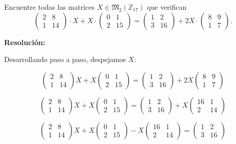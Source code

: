 \documentclass[a4paper,12pt]{article}
\begin{document}
\begin{ejercicio}[title=Ejercicio 20]
Encuentre todas las matrices $X \in \mathfrak{M}_2(\mathbb{Z}_{17})$ que verifican
\[
\begin{pmatrix}
2 & 8\\
1 & 14
\end{pmatrix} \cdot X + X \cdot
\begin{pmatrix}
0 & 1\\
2 & 15
\end{pmatrix}
=
\begin{pmatrix}
1 & 2\\
3 & 16
\end{pmatrix}
+ 2X \cdot
\begin{pmatrix}
8 & 9\\
1 & 7
\end{pmatrix}.
\]

\tcblower
\textbf{Resolución:}

Desarrollando paso a paso, despejamos $X$:

\[
\begin{pmatrix}
2 & 8\\
1 & 14
\end{pmatrix} X
+
X
\begin{pmatrix}
0 & 1\\
2 & 15
\end{pmatrix}
=
\begin{pmatrix}
1 & 2\\
3 & 16
\end{pmatrix}
+
2 X
\begin{pmatrix}
8 & 9\\
1 & 7
\end{pmatrix}
\]

\[
\begin{pmatrix}
2 & 8\\
1 & 14
\end{pmatrix} X
+
X
\begin{pmatrix}
0 & 1\\
2 & 15
\end{pmatrix}
=
\begin{pmatrix}
1 & 2\\
3 & 16
\end{pmatrix}
+
X
\begin{pmatrix}
16 & 1\\
2 & 14
\end{pmatrix}
\]

\[
\begin{pmatrix}
2 & 8\\
1 & 14
\end{pmatrix} X
+
X
\begin{pmatrix}
0 & 1\\
2 & 15
\end{pmatrix}
-
X
\begin{pmatrix}
16 & 1\\
2 & 14
\end{pmatrix}
=
\begin{pmatrix}
1 & 2\\
3 & 16
\end{pmatrix}
\]


\end{ejercicio}
\end{document}

